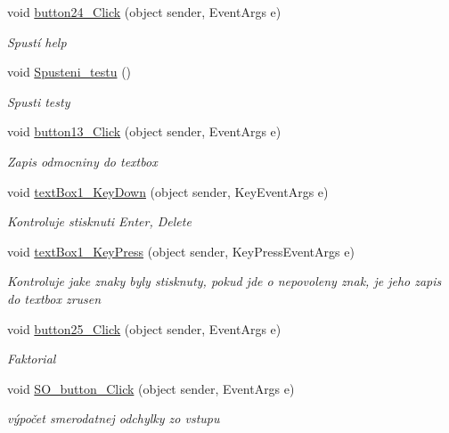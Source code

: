 \begin{DoxyCompactItemize}
void \mbox{\hyperlink{class_i_v_s_1_1_calculator_a35aa433b5f36197331eecc260dc495f3}{button24\+\_\+\+Click}} (object sender, Event\+Args e)
\begin{DoxyCompactList}\small\item\em Spustí help \end{DoxyCompactList}\item 
void \mbox{\hyperlink{class_i_v_s_1_1_calculator_a0ce50422b2626bc722577bf9e6b31469}{Spusteni\+\_\+testu}} ()
\begin{DoxyCompactList}\small\item\em Spusti testy \end{DoxyCompactList}\item 
void \mbox{\hyperlink{class_i_v_s_1_1_calculator_a03fca7b882c86953efac6a229c1289db}{button13\+\_\+\+Click}} (object sender, Event\+Args e)
\begin{DoxyCompactList}\small\item\em Zapis odmocniny do textbox \end{DoxyCompactList}\item 
void \mbox{\hyperlink{class_i_v_s_1_1_calculator_a060bd753428b6aff7325f535a6c5445f}{text\+Box1\+\_\+\+Key\+Down}} (object sender, Key\+Event\+Args e)
\begin{DoxyCompactList}\small\item\em Kontroluje stisknuti Enter, Delete \end{DoxyCompactList}\item 
void \mbox{\hyperlink{class_i_v_s_1_1_calculator_a61fcf6cf05550befa610468b0434e99e}{text\+Box1\+\_\+\+Key\+Press}} (object sender, Key\+Press\+Event\+Args e)
\begin{DoxyCompactList}\small\item\em Kontroluje jake znaky byly stisknuty, pokud jde o nepovoleny znak, je jeho zapis do textbox zrusen \end{DoxyCompactList}\item 
void \mbox{\hyperlink{class_i_v_s_1_1_calculator_a59df8db86ef51c3c105143abd36ae3da}{button25\+\_\+\+Click}} (object sender, Event\+Args e)
\begin{DoxyCompactList}\small\item\em Faktorial \end{DoxyCompactList}\item 
void \mbox{\hyperlink{class_i_v_s_1_1_calculator_a6dab5899635143716cb5528ce502684d}{S\+O\+\_\+button\+\_\+\+Click}} (object sender, Event\+Args e)
\begin{DoxyCompactList}\small\item\em výpočet smerodatnej odchylky zo vstupu \end{DoxyCompactList}\item 

\end{DoxyCompactItemize}
